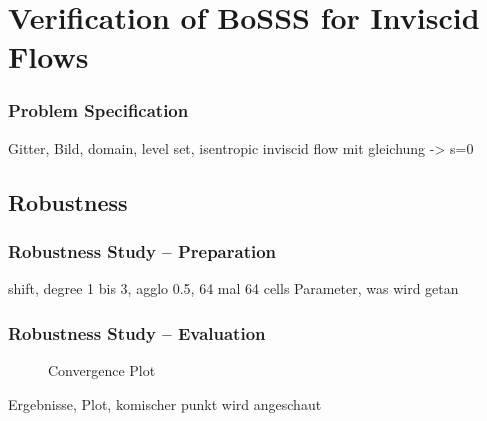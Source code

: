 \section{Verification of BoSSS for Inviscid Flows}
\frame{\tableofcontents[currentsection]}
\begin{frame}
	\frametitle{Problem Specification}
Gitter, Bild, domain, level set, isentropic inviscid flow mit gleichung -> s=0
\end{frame}
	\subsection{Robustness}
	\begin{frame}
		\frametitle{Robustness Study -- Preparation}
		shift, degree 1 bis 3, agglo 0.5, 64 mal 64 cells
		Parameter, was wird getan
	\end{frame}
	\begin{frame}
		\frametitle{Robustness Study -- Evaluation}
			\begin{figure}[htp]	
				\centering
				\caption{Convergence Plot}
				\label{shifterror}
			\end{figure}
		Ergebnisse, Plot, komischer punkt wird angeschaut
	\end{frame}
